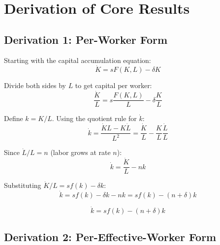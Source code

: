 \documentclass[a4paper,11pt]{article}
\begin{document}
\clearpage

\section{Derivation of Core Results}

\subsection{Derivation 1: Per-Worker Form}

\begin{derivationbox}
Starting with the capital accumulation equation:
\[
\dot{K} = sF(K,L) - \delta K
\]

Divide both sides by $L$ to get capital per worker:
\[
\frac{\dot{K}}{L} = s \frac{F(K,L)}{L} - \delta \frac{K}{L}
\]

Define $k = K/L$. Using the quotient rule for $\dot{k}$:
\[
\dot{k} = \frac{\dot{K}L - K\dot{L}}{L^2} = \frac{\dot{K}}{L} - \frac{K}{L}\frac{\dot{L}}{L}
\]

Since $\dot{L}/L = n$ (labor grows at rate $n$):
\[
\dot{k} = \frac{\dot{K}}{L} - nk
\]

Substituting $\dot{K}/L = sf(k) - \delta k$:
\[
\dot{k} = sf(k) - \delta k - nk = sf(k) - (n+\delta)k
\]
\end{derivationbox}

\begin{resultbox}
\[
\boxed{\dot{k} = sf(k) - (n + \delta)k}
\]
\end{resultbox}

\subsection{Derivation 2: Per-Effective-Worker Form}
\end{document}
